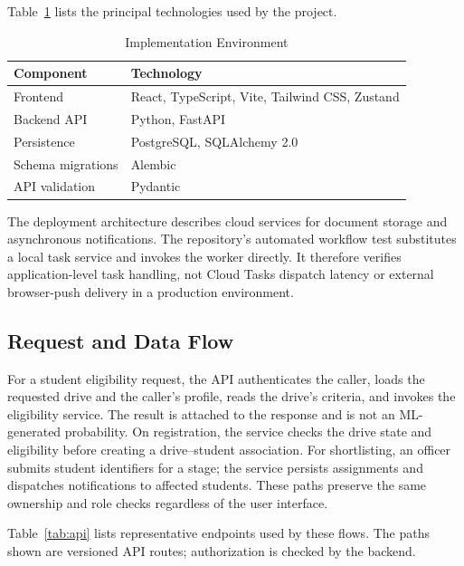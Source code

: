 \documentclass[conference,final]{IEEEtran}
\begin{document}
Table~\ref{tab:implementation} lists the principal technologies used by the project.

\begin{table}[!t]
\caption{Implementation Environment}
\label{tab:implementation}
\centering
\small
\begin{tabular}{p{} p{}}
\toprule
\textbf{Component} & \textbf{Technology} \\
\midrule
Frontend & React, TypeScript, Vite, Tailwind CSS, Zustand \\
Backend API & Python, FastAPI \\
Persistence & PostgreSQL, SQLAlchemy 2.0 \\
Schema migrations & Alembic \\
API validation & Pydantic \\
\bottomrule
\end{tabular}
\end{table}

The deployment architecture describes cloud services for document storage and asynchronous notifications. The repository's automated workflow test substitutes a local task service and invokes the worker directly. It therefore verifies application-level task handling, not Cloud Tasks dispatch latency or external browser-push delivery in a production environment.

\subsection{Request and Data Flow}
For a student eligibility request, the API authenticates the caller, loads the requested drive and the caller's profile, reads the drive's criteria, and invokes the eligibility service. The result is attached to the response and is not an ML-generated probability. On registration, the service checks the drive state and eligibility before creating a drive--student association. For shortlisting, an officer submits student identifiers for a stage; the service persists assignments and dispatches notifications to affected students. These paths preserve the same ownership and role checks regardless of the user interface.

Table~\ref{tab:api} lists representative endpoints used by these flows. The paths shown are versioned API routes; authorization is checked by the backend.
\end{document}
